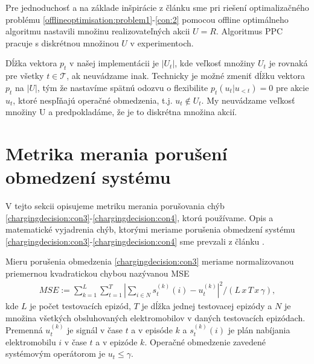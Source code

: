 Pre jednoduchosť a na základe inšpirácie z článku \cite{offlineoptimal} sme pri riešení optimalizačného problému \ref{offlineoptimisation:problem1}-\ref{con:2} pomocou offline optimálneho algoritmu nastavili množinu realizovateľných akcii $U = R$. Algoritmus PPC pracuje s diskrétnou množinou $U$ v experimentoch.


Dĺžka vektora $p_{t}$ v našej implementácii je $|U_{t}|$, kde veľkosť množiny $U_{t}$ je rovnaká pre všetky $t \in \mathcal{T}$, ak neuvádzame inak. Technicky je možné zmeniť dĺžku vektora $p_{t}$ na $|U|$, tým že nastavíme spätnú odozvu o flexibilite $p_{t}(u_{t} | u_{<t}) = 0$ pre akcie $u_{t}$, ktoré nespľňajú operačné obmedzenia, t.j. $u_{t} \notin U_{t}$. My neuvádzame veľkosť množiny U a predpokladáme, že je to diskrétna množina akcií. 







\section{Metrika merania porušení obmedzení systému}
V tejto sekcii opisujeme metriku merania porušovania chýb \eqref{chargingdecision:con3}-\eqref{chargingdecision:con4}, ktorú používame. 
Opis a matematické vyjadrenia chýb, ktorými meriame porušenia obmedzení systému \eqref{chargingdecision:con3}-\eqref{chargingdecision:con4} sme prevzali z článku \cite{Li_2021}.



Mieru porušenia obmedzenia \eqref{chargingdecision:con3} meriame normalizovanou  priemernou kvadratickou chybou nazývanou MSE 
\begin{gather*}
    MSE := \sum_{k=1}^{L} \sum_{t=1}^{T}|\sum_{i \in N} s_{t}^{(k)}(i) - u_{t}^{(k)}|^{2} / (L \, x \, T \, x \, \gamma),
\end{gather*}
kde $L$ je počet testovacích epizód, $T$ je dĺžka jednej testovacej epizódy a $N$ je množina všetkých obsluhovaných elektromobilov v daných testovacích epizódach. Premenná $u_{t}^{(k)}$ je signál v čase $t$ a v episóde $k$ a $s_{t}^{(k)}(i)$ je plán nabíjania elektromobilu $i$ v čase $t$ a v epizóde $k$. Operačné obmedzenie zavedené systémovým operátorom je $u_{t} \leq \gamma$.

